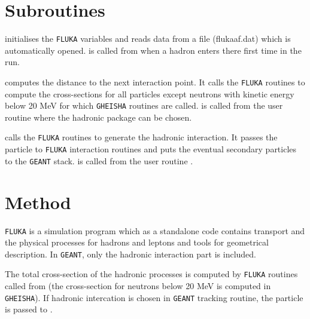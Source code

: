  
\section{Subroutines}

 initialises the {\tt FLUKA} variables and
reads data from a file (flukaaf.dat) which is automatically
opened.
 is called from  when a hadron 
enters there first time in the run.


 computes the distance to the next interaction
point. It calls the {\tt FLUKA} routines to compute the
cross-sections for all particles except neutrons with
kinetic energy below 20 MeV for which {\tt GHEISHA}
routines are called.
 is called from the user routine 
where the hadronic package can be chosen.

 calls the {\tt FLUKA} routines to
generate the hadronic interaction. It passes the
particle to {\tt FLUKA} interaction routines
and puts the eventual secondary particles to
the {\tt GEANT} stack.  is called from
the user routine .

\section{Method}
{\tt FLUKA}
\cite{bib-FLUK,bib-FLU1,bib-FLU2,bib-FLU3,bib-FLU4,bib-FLU5,bib-FLU6}
is a simulation program
which as a standalone code contains transport and the
physical processes for hadrons and leptons and
tools for geometrical description. 
In {\tt GEANT}, only the hadronic interaction part
is included.

The total cross-section of the hadronic processes
is computed by {\tt FLUKA} routines called from
 (the cross-section for neutrons below
20 MeV is computed in {\tt GHEISHA}). If hadronic
intercation is chosen in {\tt GEANT} tracking routine,
the particle is passed to .


